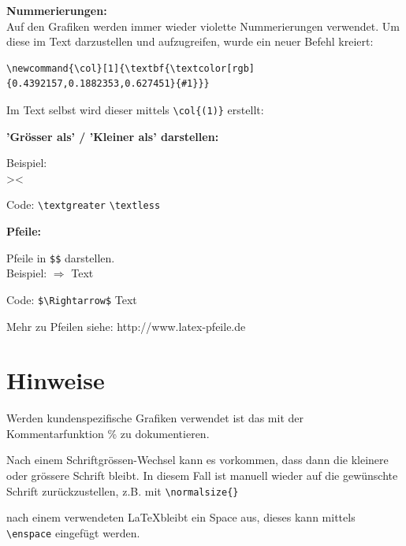 \vspace{\baselineskip}

\textbf{Nummerierungen:}\\
Auf den Grafiken werden immer wieder violette Nummerierungen verwendet. Um diese im Text darzustellen und aufzugreifen, wurde ein neuer Befehl kreiert:

\begin{verbatim}
\newcommand{\col}[1]{\textbf{\textcolor[rgb]{0.4392157,0.1882353,0.627451}{#1}}}
\end{verbatim}

Im Text selbst wird dieser mittels \verb+\col{(1)}+ erstellt: 

\vspace{\baselineskip}

\textbf{'Grösser als' / 'Kleiner als' darstellen:}

Beispiel:\\
\textgreater \quad \textless

Code: \verb+\textgreater+ \quad \verb+\textless+

\vspace{\baselineskip}

\textbf{Pfeile:}

Pfeile in \verb+$$+ darstellen.\\

Beispiel: $\Rightarrow$ Text 

Code: \verb+$\Rightarrow$+ Text

\vspace{\baselineskip}

Mehr zu Pfeilen siehe: http://www.latex-pfeile.de






\pagebreak
\section{Hinweise} 

\begin{compactitem}
	\item Werden kundenspezifische Grafiken verwendet ist das mit der Kommentarfunktion \% zu dokumentieren.
	\item Nach einem Schriftgrössen-Wechsel kann es vorkommen, dass dann die kleinere oder grössere Schrift bleibt. In diesem Fall ist manuell wieder auf die gewünschte Schrift zurückzustellen, z.B. mit \verb+\normalsize{}+
	\item nach einem verwendeten \LaTeX \enspace bleibt ein Space aus, dieses kann mittels \verb+\enspace+ eingefügt werden.

\end{compactitem}

